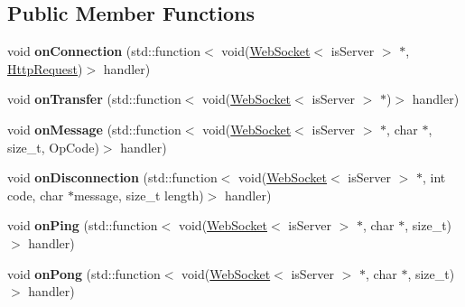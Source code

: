 \subsection*{Public Member Functions}
\begin{DoxyCompactItemize}
\item 
\mbox{\label{structu_w_s_1_1_group_a3be07500b72391623fba23d20c8aa5ce}} 
void {\bfseries on\+Connection} (std\+::function$<$ void(\mbox{\hyperlink{structu_w_s_1_1_web_socket}{Web\+Socket}}$<$ is\+Server $>$ $\ast$, \mbox{\hyperlink{structu_w_s_1_1_http_request}{Http\+Request}})$>$ handler)
\item 
\mbox{\label{structu_w_s_1_1_group_af1f9fadfbab8b45affebd19935776956}} 
void {\bfseries on\+Transfer} (std\+::function$<$ void(\mbox{\hyperlink{structu_w_s_1_1_web_socket}{Web\+Socket}}$<$ is\+Server $>$ $\ast$)$>$ handler)
\item 
\mbox{\label{structu_w_s_1_1_group_a8b60e4836e35162318b792577fdc9c7d}} 
void {\bfseries on\+Message} (std\+::function$<$ void(\mbox{\hyperlink{structu_w_s_1_1_web_socket}{Web\+Socket}}$<$ is\+Server $>$ $\ast$, char $\ast$, size\+\_\+t, Op\+Code)$>$ handler)
\item 
\mbox{\label{structu_w_s_1_1_group_af6fc1d835096273b87d57f99896b17b2}} 
void {\bfseries on\+Disconnection} (std\+::function$<$ void(\mbox{\hyperlink{structu_w_s_1_1_web_socket}{Web\+Socket}}$<$ is\+Server $>$ $\ast$, int code, char $\ast$message, size\+\_\+t length)$>$ handler)
\item 
\mbox{\label{structu_w_s_1_1_group_a5cf47343619b1b6f06665fe1e3345e0e}} 
void {\bfseries on\+Ping} (std\+::function$<$ void(\mbox{\hyperlink{structu_w_s_1_1_web_socket}{Web\+Socket}}$<$ is\+Server $>$ $\ast$, char $\ast$, size\+\_\+t)$>$ handler)
\item 
\mbox{\label{structu_w_s_1_1_group_a92ca1fa24e07ed67b922edcba8c9d125}} 
void {\bfseries on\+Pong} (std\+::function$<$ void(\mbox{\hyperlink{structu_w_s_1_1_web_socket}{Web\+Socket}}$<$ is\+Server $>$ $\ast$, char $\ast$, size\+\_\+t)$>$ handler)
\item 
\mbox{\label{structu_w_s_1_1_group_a660da695c67c60264c5c222f49a3884c}} 

\end{DoxyCompactItemize}
